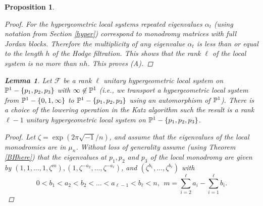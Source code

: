 \documentclass[11pt]{amsart}
\newtheorem{remark}[theorem]{ Remark}
\newtheorem{proposition}[theorem]{Proposition}
\newtheorem{lemma}[theorem]{Lemma}
\numberwithin{theorem}{subsection}
\begin{document}
{\begin{proposition}
\begin{proof}
For the hypergeometric local systems repeated eigenvalues $\alpha_t$ (using notation from Section \ref{hyper})  correspond to monodromy matrices with full Jordan blocks. Therefore
the multiplicity of any eigenvalue $\alpha_t$ is less than or equal to the length $h$ of the Hodge filtration. This shows that the rank $\ell$ of the local system is no more than $nh$. This proves (A).
\end{proof}

\begin{lemma}\label{hyperreduction}
 Let $\mathcal{F}$ be a rank $\ell$ unitary hypergeometric local system on $\Bbb{P}^1-\{p_1,p_2,p_3\}$ with $\infty\not\in \Bbb{P}^1$ (i.e., we transport a hypergeometric local system from $\Bbb{P}^1-\{0,1,\infty\}$ to $\Bbb{P}^1-\{p_1,p_2,p_3\}$ using an automorphism of $\Bbb{P}^1$). There is a choice of the lowering operation in the Katz algorithm such the result is a rank $\ell-1$ unitary hypergeometric local system on $\Bbb{P}^1-\{p_1,p_2,p_3\}$.
 \end{lemma}
 \begin{proof}
Let $\zeta=\exp(2\pi\sqrt{-1}/n)$, and assume that the eigenvalues of the local monodromies are in $\mu_n$.  Without loss of generality assume (using Theorem \ref{BHhere}) that the eigenvalues at $p_1,p_2$ and $p_3$ of the local monodromy are given by $(1,1,\dots,1,\zeta^m), (1,\zeta^{-a_2},\dots,\zeta^{-a_{\ell}})$, and $(\zeta^{b_1},\dots,\zeta^{b_{\ell}})$ with
  \begin{equation}\label{interlace}
  0<b_1<a_2<b_2<\dots<a_{\ell-1}<b_{\ell}<n, \ \ m=\sum_{i=2}^{\ell} a_i-\sum_{i=1}^\ell b_i.
  \end{equation}


\end{proof}
\end{proposition}}
\end{document}
